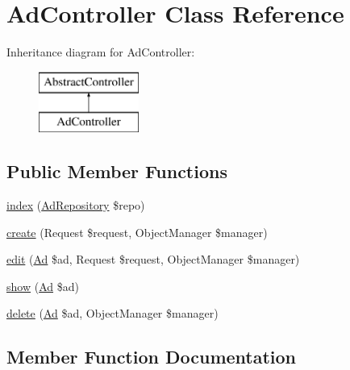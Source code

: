 \hypertarget{class_app_1_1_controller_1_1_ad_controller}{}\section{Ad\+Controller Class Reference}
\label{class_app_1_1_controller_1_1_ad_controller}
Inheritance diagram for Ad\+Controller\+:\begin{figure}[H]
\begin{center}
\leavevmode
\includegraphics[height=2.000000cm]{class_app_1_1_controller_1_1_ad_controller}
\end{center}
\end{figure}
\subsection*{Public Member Functions}
\begin{DoxyCompactItemize}
\item 
\mbox{\hyperlink{class_app_1_1_controller_1_1_ad_controller_af14e0bf9006c01621d25e389c3f94e28}{index}} (\mbox{\hyperlink{class_app_1_1_repository_1_1_ad_repository}{Ad\+Repository}} \$repo)
\item 
\mbox{\hyperlink{class_app_1_1_controller_1_1_ad_controller_a98e82be5d980b9fddaef01ed97145c4d}{create}} (Request \$request, Object\+Manager \$manager)
\item 
\mbox{\hyperlink{class_app_1_1_controller_1_1_ad_controller_a2d0b3cb3e83150dd16ff78aa9b5bdc78}{edit}} (\mbox{\hyperlink{class_app_1_1_entity_1_1_ad}{Ad}} \$ad, Request \$request, Object\+Manager \$manager)
\item 
\mbox{\hyperlink{class_app_1_1_controller_1_1_ad_controller_ac306f7bedbae8f6f8bb15bcc0ae9cd6c}{show}} (\mbox{\hyperlink{class_app_1_1_entity_1_1_ad}{Ad}} \$ad)
\item 
\mbox{\hyperlink{class_app_1_1_controller_1_1_ad_controller_a1fd28d9ca7903c3b1cff914b9c4fdb72}{delete}} (\mbox{\hyperlink{class_app_1_1_entity_1_1_ad}{Ad}} \$ad, Object\+Manager \$manager)
\end{DoxyCompactItemize}


\subsection{Member Function Documentation}
\mbox{\label{class_app_1_1_controller_1_1_ad_controller_a98e82be5d980b9fddaef01ed97145c4d}} 
